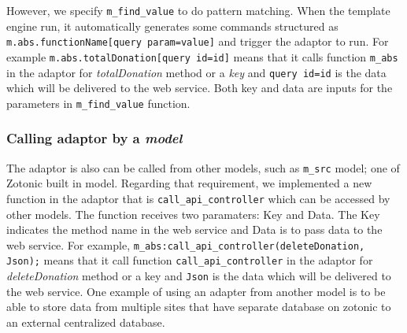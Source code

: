 \documentclass[conference]{IEEEtran}
\begin{document}
However, we specify \texttt{m\_find\_value} to do pattern matching. When the template engine run, it automatically generates some commands structured as \texttt{m.abs.functionName[{query param=value}]} and trigger the adaptor to run. For example \texttt{{{m.abs.totalDonation[{query id=id}]}}} means that it calls function \texttt{m\_abs} in the adaptor for \textit{totalDonation} method or a \textit{key} and \texttt{{query id=id}} is the data which will be delivered to the web service. Both key and data are inputs for the parameters in \texttt{m\_find\_value} function.
%
%
% 
% 
%  
%  
%
%

%

\subsubsection{Calling adaptor by a \textit{model}}
The adaptor is also can be called from other models, such as \texttt{m\_src} model; one of Zotonic built in model. Regarding that requirement, we implemented a new function in the adaptor that is \texttt{call\_api\_controller} which can be accessed by other models. The function receives two paramaters: Key and Data. The Key indicates the method name in the web service and Data is to pass data to the web service. For example, \texttt{m\_abs:call\_api\_controller(deleteDonation, Json);} means that it call function \texttt{call\_api\_controller} in the adaptor for \textit{deleteDonation} method or a key and \texttt{Json} is the data which will be delivered to the web service. One example of using an adapter from another model is to be able to store data from multiple sites that have separate database on zotonic to an external centralized database.
\end{document}
